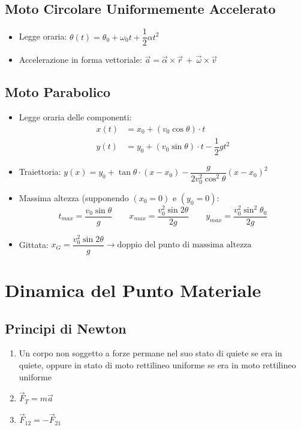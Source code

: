 \documentclass[10pt,a4paper]{article}
\begin{document}
	\vspace{5mm}
	\subsection{Moto Circolare Uniformemente Accelerato}
	\begin{itemize}
	\item Legge oraria: \( \theta(t) = \theta_0 + \omega_0 t + \dfrac{1}{2}\alpha t^2 \)
	\item Accelerazione in forma vettoriale: \( \vec{a} = \vec{\alpha} \times \vec{r} \, + \,  \vec{\omega} \times \vec{v} \)
	\end{itemize}

	\vspace{5mm}
	\subsection{Moto Parabolico}
	\begin{itemize}
	\item Legge oraria delle componenti:
		\begin{align*}
		x(t) &= x_0 + (v_0\cos\theta)\cdot t \\
		y(t) &= y_0 + (v_0\sin\theta)\cdot t - \dfrac{1}{2}gt^2
		\end{align*}
	\item Traiettoria: \( y(x) = y_0 + \tan\theta\cdot(x-x_0) - \dfrac{g}{2v_0^2\cos^2\theta}(x-x_0)^2 \)
	\item Massima altezza (supponendo \( (x_0=0)\) e \( (y_0=0) \): 
		\[
		t_{max} = \dfrac{v_0\sin\theta}{g} \qquad 
		x_{max} = \dfrac{v_0^2\sin2\theta}{2g} \qquad
		y_{max} = \dfrac{v_0^2\sin^2\theta_0}{2g} 
		\]
	\item Gittata:  \( x_G = \dfrac{v_0^2\sin2\theta}{g} \rightarrow \text{doppio del punto di massima altezza}\)
	\end{itemize}

	
	\vspace{10mm}
	\section{Dinamica del Punto Materiale}
	\subsection{Principi di Newton}
	\begin{enumerate}
	\item Un corpo non soggetto a forze permane nel suo stato di quiete se era in quiete, oppure in stato di moto rettilineo uniforme se era in moto rettilineo uniforme
	\item \( \vec{F}_T = m\vec{a} \)
	\item \( \vec{F}_{12} = -\vec{F}_{21} \)
	\end{enumerate}
\end{document}

